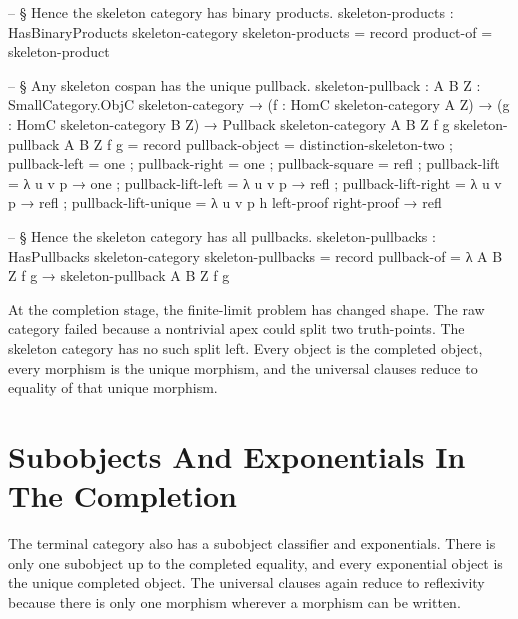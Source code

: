 \documentclass[11pt]{article}
\begin{document}
\begin{code}
-- § Hence the skeleton category has binary products.
skeleton-products : HasBinaryProducts skeleton-category
skeleton-products = record
  { product-of = skeleton-product
  }

-- § Any skeleton cospan has the unique pullback.
skeleton-pullback :
  {A B Z : SmallCategory.ObjC skeleton-category} →
  (f : HomC skeleton-category A Z) →
  (g : HomC skeleton-category B Z) →
  Pullback skeleton-category {A} {B} {Z} f g
skeleton-pullback {A} {B} {Z} f g = record
  { pullback-object      = distinction-skeleton-two
  ; pullback-left        = one
  ; pullback-right       = one
  ; pullback-square      = refl
  ; pullback-lift        = λ u v p → one
  ; pullback-lift-left   = λ u v p → refl
  ; pullback-lift-right  = λ u v p → refl
  ; pullback-lift-unique = λ u v p h left-proof right-proof → refl
  }

-- § Hence the skeleton category has all pullbacks.
skeleton-pullbacks : HasPullbacks skeleton-category
skeleton-pullbacks = record
  { pullback-of = λ {A} {B} {Z} f g → skeleton-pullback {A} {B} {Z} f g
  }
\end{code}

At the completion stage, the finite-limit problem has changed shape.
The raw category failed because a nontrivial apex could split two
truth-points.  The skeleton category has no such split left.  Every
object is the completed object, every morphism is the unique morphism,
and the universal clauses reduce to equality of that unique morphism.

\section{Subobjects And Exponentials In The Completion}

The terminal category also has a subobject classifier and exponentials.
There is only one subobject up to the completed equality, and every
exponential object is the unique completed object.  The universal clauses
again reduce to reflexivity because there is only one morphism wherever a
morphism can be written.
\end{document}
